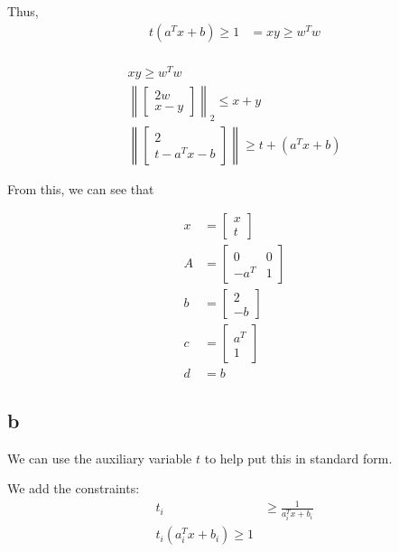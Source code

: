 \documentclass{report}
\begin{document}
Thus, 
\begin{align*}
	t(a^{T}x + b) \ge 1 &= xy \ge w^{T}w \\
\end{align*}

\begin{align*}
	xy \ge w^{T}w \\
	\left\lVert \begin{bmatrix}
		2w\\
		x-y
	\end{bmatrix} \right \rVert_{2} \le x + y\\
	\left\lVert \begin{bmatrix}
		2\\ 
		t - a^{T}x - b
	\end{bmatrix} \right\rVert \ge t + (a^{T}x + b)
\end{align*}

From this, we can see that 

\begin{align*}
		x &=  \begin{bmatrix}
		x\\
		t
	\end{bmatrix}\\
A &= \begin{bmatrix}
		0 & 0\\
		-a^{T} & 1
	\end{bmatrix}\\
b&= \begin{bmatrix}
	2\\
	-b
\end{bmatrix} \\
c &= \begin{bmatrix}
	a^{T} \\1
\end{bmatrix} \\
	d &= b
\end{align*}

\subsection{b}

We can use the auxiliary variable $ t $ to help put this in standard form. 

We add the constraints: 
\begin{align*}
	t_{i} &\ge \frac{1}{a_{i}^{T}x + b_{i}}\\
	t_{i}(a_{i}^{T}x + b_{i}) \ge 1	
\end{align*}
\end{document}
